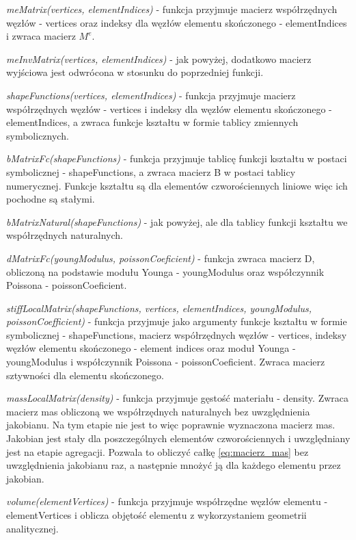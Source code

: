 \vspace {3mm}
\textit{meMatrix(vertices, elementIndices)} - funkcja przyjmuje macierz współrzędnych węzłów - vertices oraz indeksy dla węzłów elementu skończonego - elementIndices i zwraca macierz \( M^e \).

\vspace {3mm}
\textit{meInvMatrix(vertices, elementIndices)} - jak powyżej, dodatkowo macierz wyjściowa jest odwrócona w stosunku do poprzedniej funkcji.

\vspace {3mm}
\textit{shapeFunctions(vertices, elementIndices)} - funkcja przyjmuje macierz współrzędnych węzłów - vertices i indeksy dla węzłów elementu skończonego - elementIndices, a zwraca funkcje kształtu w formie tablicy zmiennych symbolicznych.

\vspace {3mm}
\textit{bMatrixFc(shapeFunctions)} - funkcja przyjmuje tablicę funkcji kształtu w postaci symbolicznej - shapeFunctions, a zwraca macierz B w postaci tablicy numerycznej. Funkcje kształtu są dla elementów czworościennych liniowe więc ich pochodne są stałymi. 

\vspace {3mm}
\textit{bMatrixNatural(shapeFunctions)} - jak powyżej, ale dla tablicy funkcji kształtu we współrzędnych naturalnych.

\vspace {3mm}
\textit{dMatrixFc(youngModulus, poissonCoeficient)} - funkcja zwraca macierz D, obliczoną na podstawie modułu Younga - youngModulus oraz współczynnik Poissona - poissonCoeficient.

\vspace {3mm}
\textit{stiffLocalMatrix(shapeFunctions, vertices, elementIndices, youngModulus, poissonCoefficient)} - funkcja przyjmuje jako argumenty funkcje kształtu w formie symbolicznej - shapeFunctions, macierz współrzędnych węzłów - vertices, indeksy węzłów elementu skończonego - element indices oraz moduł Younga - youngModulus i współczynnik Poissona - poissonCoeficient. Zwraca macierz sztywności dla elementu skończonego.

\vspace {3mm}
\textit{massLocalMatrix(density)} - funkcja przyjmuje gęstość materiału - density. Zwraca macierz mas obliczoną we współrzędnych naturalnych bez uwzględnienia jakobianu. Na tym etapie nie jest to więc poprawnie wyznaczona macierz mas. Jakobian jest stały dla poszczególnych elementów czworościennych i uwzględniany jest na etapie agregacji. Pozwala to obliczyć całkę \ref{eq:macierz_mas} bez uwzględnienia jakobianu raz, a następnie mnożyć ją dla każdego elementu przez jakobian.

\vspace {3mm}
\textit{volume(elementVertices)} - funkcja przyjmuje współrzędne węzłów elementu - elementVertices i oblicza objętość elementu z wykorzystaniem geometrii analitycznej.

